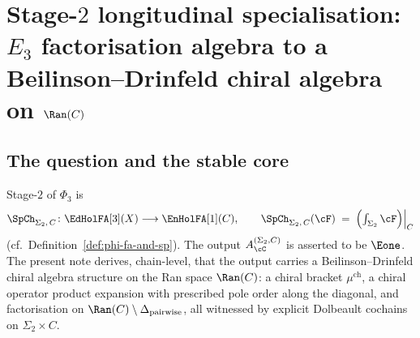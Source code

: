 %
%

\section{Stage-$2$ longitudinal specialisation: \texorpdfstring{$E_3$}{E-3} factorisation algebra to a Beilinson--Drinfeld chiral algebra on \texorpdfstring{$\Ran(C)$}{Ran(C)}}
\label{wn:sec:agent3-stage2-e1-ran-specialisation}

\subsection{The question and the stable core}
\label{wn:subsec:agent3-stable-core}

Stage-$2$ of $\Phi_3$ is
\[
 \SpCh_{\Sigma_2,\,C}\colon
 \EdHolFA[3](X)\longrightarrow
 \EnHolFA[1](C),\qquad
 \SpCh_{\Sigma_2,\,C}(\cF)\;=\;\Bigl(\textstyle\int_{\Sigma_2}\cF\Bigr)\Big|_C
\]
(cf.\ Definition~\ref{def:phi-fa-and-sp}). The output $A^{(\Sigma_2,C)}_\cC$ is asserted to be $\Eone$. The present note derives, chain-level, that the output carries a Beilinson--Drinfeld chiral algebra structure on the Ran space $\Ran(C)$: a chiral bracket $\mu^{\mathrm{ch}}$, a chiral operator product expansion with prescribed pole order along the diagonal, and factorisation on $\Ran(C)\setminus\Delta_{\text{pairwise}}$, all witnessed by explicit Dolbeault cochains on $\Sigma_2\times C$.

